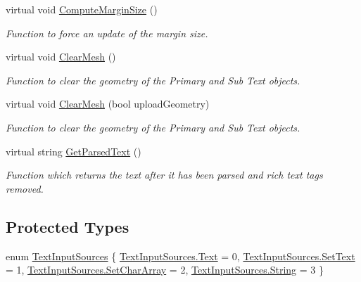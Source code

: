 \begin{DoxyCompactItemize}
virtual void \mbox{\hyperlink{class_t_m_pro_1_1_t_m_p___text_a9e380bad2a5506d96b7c1d3b0b12d013}{Compute\+Margin\+Size}} ()
\begin{DoxyCompactList}\small\item\em Function to force an update of the margin size. \end{DoxyCompactList}\item 
virtual void \mbox{\hyperlink{class_t_m_pro_1_1_t_m_p___text_a9bd7b659f2a1b2feb48f3b3008d09ee6}{Clear\+Mesh}} ()
\begin{DoxyCompactList}\small\item\em Function to clear the geometry of the Primary and Sub Text objects. \end{DoxyCompactList}\item 
virtual void \mbox{\hyperlink{class_t_m_pro_1_1_t_m_p___text_af3f756ddaf2d3f82ddddb27b6f66a15f}{Clear\+Mesh}} (bool upload\+Geometry)
\begin{DoxyCompactList}\small\item\em Function to clear the geometry of the Primary and Sub Text objects. \end{DoxyCompactList}\item 
virtual string \mbox{\hyperlink{class_t_m_pro_1_1_t_m_p___text_a0cdf3acfceafe3443a2851dea9db0bb8}{Get\+Parsed\+Text}} ()
\begin{DoxyCompactList}\small\item\em Function which returns the text after it has been parsed and rich text tags removed. \end{DoxyCompactList}\end{DoxyCompactItemize}
\subsection*{Protected Types}
\begin{DoxyCompactItemize}
\item 
enum \mbox{\hyperlink{class_t_m_pro_1_1_t_m_p___text_ad5e8f5f99ee7ce332ad3531b8ba0096d}{Text\+Input\+Sources}} \{ \mbox{\hyperlink{class_t_m_pro_1_1_t_m_p___text_ad5e8f5f99ee7ce332ad3531b8ba0096da9dffbf69ffba8bc38bc4e01abf4b1675}{Text\+Input\+Sources.\+Text}} = 0, 
\mbox{\hyperlink{class_t_m_pro_1_1_t_m_p___text_ad5e8f5f99ee7ce332ad3531b8ba0096da25648f908bdc21257a45044512a011c9}{Text\+Input\+Sources.\+Set\+Text}} = 1, 
\mbox{\hyperlink{class_t_m_pro_1_1_t_m_p___text_ad5e8f5f99ee7ce332ad3531b8ba0096da66e3abfcf41eacd20b6577cd26d17b23}{Text\+Input\+Sources.\+Set\+Char\+Array}} = 2, 
\mbox{\hyperlink{class_t_m_pro_1_1_t_m_p___text_ad5e8f5f99ee7ce332ad3531b8ba0096da27118326006d3829667a400ad23d5d98}{Text\+Input\+Sources.\+String}} = 3
 \}
\end{DoxyCompactItemize}
